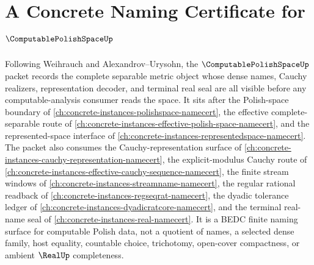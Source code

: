 \chapter{A Concrete Naming Certificate for $\ComputablePolishSpaceUp$}
\label{ch:concrete-instances-computable-polish-space-namecert}

Following Weihrauch and Alexandrov--Urysohn, the $\ComputablePolishSpaceUp$ packet records the complete separable metric object whose dense names, Cauchy realizers, representation decoder, and terminal real seal are all visible before any computable-analysis consumer reads the space. It sits after the Polish-space boundary of \autoref{ch:concrete-instances-polishspace-namecert}, the effective complete-separable route of \autoref{ch:concrete-instances-effective-polish-space-namecert}, and the represented-space interface of \autoref{ch:concrete-instances-representedspace-namecert}. The packet also consumes the Cauchy-representation surface of \autoref{ch:concrete-instances-cauchy-representation-namecert}, the explicit-modulus Cauchy route of \autoref{ch:concrete-instances-effective-cauchy-sequence-namecert}, the finite stream windows of \autoref{ch:concrete-instances-streamname-namecert}, the regular rational readback of \autoref{ch:concrete-instances-regseqrat-namecert}, the dyadic tolerance ledger of \autoref{ch:concrete-instances-dyadicratcore-namecert}, and the terminal real-name seal of \autoref{ch:concrete-instances-real-namecert}. It is a BEDC finite naming surface for computable Polish data, not a quotient of names, a selected dense family, host equality, countable choice, trichotomy, open-cover compactness, or ambient $\RealUp$ completeness.


